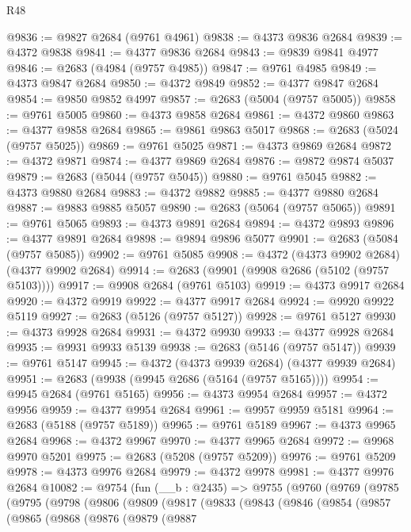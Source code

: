 \begin{lexlean}{R48}
\begin{coremodule}
@9836 := @9827 @2684 (@9761 @4961)
@9838 := @4373 @9836 @2684
@9839 := @4372 @9838
@9841 := @4377 @9836 @2684
@9843 := @9839 @9841 @4977
@9846 := @2683 (@4984 (@9757 @4985))
@9847 := @9761 @4985
@9849 := @4373 @9847 @2684
@9850 := @4372 @9849
@9852 := @4377 @9847 @2684
@9854 := @9850 @9852 @4997
@9857 := @2683 (@5004 (@9757 @5005))
@9858 := @9761 @5005
@9860 := @4373 @9858 @2684
@9861 := @4372 @9860
@9863 := @4377 @9858 @2684
@9865 := @9861 @9863 @5017
@9868 := @2683 (@5024 (@9757 @5025))
@9869 := @9761 @5025
@9871 := @4373 @9869 @2684
@9872 := @4372 @9871
@9874 := @4377 @9869 @2684
@9876 := @9872 @9874 @5037
@9879 := @2683 (@5044 (@9757 @5045))
@9880 := @9761 @5045
@9882 := @4373 @9880 @2684
@9883 := @4372 @9882
@9885 := @4377 @9880 @2684
@9887 := @9883 @9885 @5057
@9890 := @2683 (@5064 (@9757 @5065))
@9891 := @9761 @5065
@9893 := @4373 @9891 @2684
@9894 := @4372 @9893
@9896 := @4377 @9891 @2684
@9898 := @9894 @9896 @5077
@9901 := @2683 (@5084 (@9757 @5085))
@9902 := @9761 @5085
@9908 := @4372 (@4373 @9902 @2684) (@4377 @9902 @2684)
@9914 := @2683 (@9901 (@9908 @2686 (@5102 (@9757 @5103))))
@9917 := @9908 @2684 (@9761 @5103)
@9919 := @4373 @9917 @2684
@9920 := @4372 @9919
@9922 := @4377 @9917 @2684
@9924 := @9920 @9922 @5119
@9927 := @2683 (@5126 (@9757 @5127))
@9928 := @9761 @5127
@9930 := @4373 @9928 @2684
@9931 := @4372 @9930
@9933 := @4377 @9928 @2684
@9935 := @9931 @9933 @5139
@9938 := @2683 (@5146 (@9757 @5147))
@9939 := @9761 @5147
@9945 := @4372 (@4373 @9939 @2684) (@4377 @9939 @2684)
@9951 := @2683 (@9938 (@9945 @2686 (@5164 (@9757 @5165))))
@9954 := @9945 @2684 (@9761 @5165)
@9956 := @4373 @9954 @2684
@9957 := @4372 @9956
@9959 := @4377 @9954 @2684
@9961 := @9957 @9959 @5181
@9964 := @2683 (@5188 (@9757 @5189))
@9965 := @9761 @5189
@9967 := @4373 @9965 @2684
@9968 := @4372 @9967
@9970 := @4377 @9965 @2684
@9972 := @9968 @9970 @5201
@9975 := @2683 (@5208 (@9757 @5209))
@9976 := @9761 @5209
@9978 := @4373 @9976 @2684
@9979 := @4372 @9978
@9981 := @4377 @9976 @2684
@10082 := @9754
    (fun (__b : @2435) =>
    @9755
      (@9760
        (@9769
          (@9785
            (@9795
              (@9798
                (@9806
                  (@9809
                    (@9817
                      (@9833
                        (@9843
                          (@9846
                            (@9854
                              (@9857
                                (@9865
                                  (@9868
                                    (@9876
                                      (@9879
                                        (@9887

\end{coremodule}
\end{lexlean}
